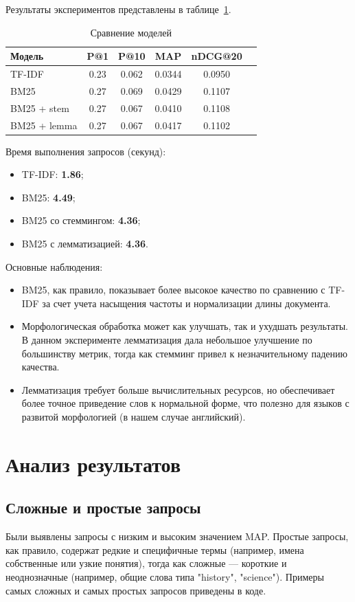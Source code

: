 \documentclass[11pt]{article}
\begin{document}
Результаты экспериментов представлены в таблице~\ref{tab:results}.

\begin{table}[h]
\centering
\begin{tabular}{lccccc}
\hline
Модель & P@1 & P@10 & MAP & nDCG@20 \\
\hline
TF-IDF & 0.23 & 0.062 & 0.0344 & 0.0950 \\
BM25 & 0.27 & 0.069 & 0.0429 & 0.1107 \\
BM25 + stem & 0.27 & 0.067 & 0.0410 & 0.1108 \\
BM25 + lemma & 0.27 & 0.067 & 0.0417 & 0.1102 \\
\hline
\end{tabular}
\caption{Сравнение моделей}
\label{tab:results}
\end{table}

Время выполнения запросов (секунд):
\begin{itemize}
    \item TF-IDF: \textbf{1.86};
    \item BM25: \textbf{4.49};
    \item BM25 со стеммингом: \textbf{4.36};
    \item BM25 с лемматизацией: \textbf{4.36}.
\end{itemize}

Основные наблюдения:
\begin{itemize}
    \item BM25, как правило, показывает более высокое качество по сравнению с
    TF-IDF за счет учета насыщения частоты и нормализации длины документа.
    \item Морфологическая обработка может как улучшать, так и ухудшать результаты.
    В данном эксперименте лемматизация дала небольшое улучшение по большинству
    метрик, тогда как стемминг привел к незначительному падению качества.
    \item Лемматизация требует больше вычислительных ресурсов, но обеспечивает
    более точное приведение слов к нормальной форме, что полезно для языков с
    развитой морфологией (в нашем случае английский).
\end{itemize}

\section{Анализ результатов}

\subsection{Сложные и простые запросы}
Были выявлены запросы с низким и высоким значением MAP. Простые запросы, как
правило, содержат редкие и специфичные термы (например, имена собственные или узкие
понятия), тогда как сложные — короткие и неоднозначные (например, общие слова типа
"history", "science"). Примеры самых сложных и самых простых запросов приведены в коде.
\end{document}
